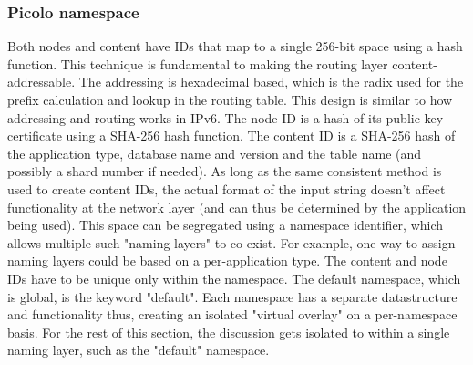 \subsubsection{Picolo namespace} 
\label{net:namespace}

Both nodes and content have IDs that map to a single 256-bit space using a hash function. This technique is fundamental
to making the routing layer content-addressable. The addressing is hexadecimal based, which is the radix used for the
prefix calculation and lookup in the routing table. This design is similar to how addressing and routing works in IPv6.
The node ID is a hash of its public-key certificate using a SHA-256 hash function. The content ID is a SHA-256 hash of
the application type, database name and version and the table name (and possibly a shard number if needed). As long as
the same consistent method is used to create content IDs, the actual format of the input string doesn't affect
functionality at the network layer (and can thus be determined by the application being used). 
\newline\newline
This space can be segregated using a namespace identifier, which allows multiple such "naming layers" to co-exist. For
example, one way to assign naming layers could be based on a per-application type. The content and node IDs have to be
unique only within the namespace. The default namespace, which is global, is the keyword "default". Each namespace has a separate datastructure and functionality thus, creating an isolated "virtual overlay" on a
per-namespace basis. For the rest of this section, the discussion gets isolated to within a single naming layer, such as
the "default" namespace.

